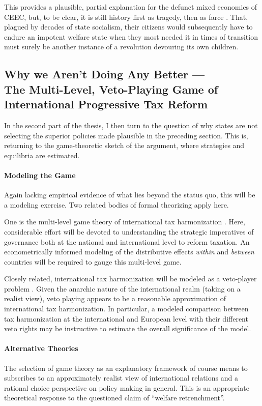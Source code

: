 This provides a plausible, partial explanation for the defunct mixed economies of \gls{CEEC}, but, to be clear, it is still history first as tragedy, then as farce \citep{Marx1852}. That, plagued by decades of state socialism, their citizens would subsequently have to endure an impotent welfare state when they most needed it in times of transition must surely be another instance of a revolution devouring its own children.


\subsection{Why we Aren't Doing Any Better ---\\The Multi-Level, Veto-Playing Game of International Progressive Tax Reform}

In the second part of the thesis, I then turn to the question of why states are not selecting the superior policies made plausible in the preceding section. This is, returning to the game-theoretic sketch of the argument, where strategies and equilibria are estimated.

\paragraph{Modeling the Game}
Again lacking empirical evidence of what lies beyond the status quo, this will be a modeling exercise.
Two related bodies of formal theorizing apply here. 

One is the multi-level game theory of international tax harmonization \citep{Scharpf-1997-aa}. Here, considerable effort will be devoted to understanding the strategic imperatives of governance both at the national and international level to reform taxation. An econometrically informed modeling of the distributive effects \emph{within} and \emph{between} countries will be required to gauge this multi-level game.

Closely related, international tax harmonization will be modeled as a veto-player problem \citep{Tsebelis-2002-aa}. Given the anarchic nature of the international realm (taking on a realist view), veto playing appears to be a reasonable approximation of international tax harmonization. In particular, a modeled comparison between tax harmonization at the international and European level with their different veto rights may be instructive to estimate the overall significance of the model.

\paragraph{Alternative Theories}
The selection of game theory as an explanatory framework of course means to subscribes to an approximately realist view of international relations and a rational choice perspective on policy making in general. This is an appropriate theoretical response to the questioned claim of ``welfare retrenchment''.

